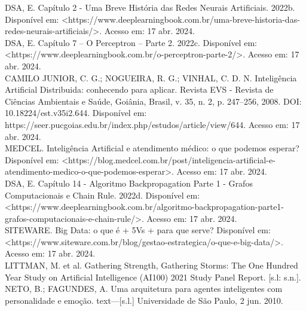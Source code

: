 \documentclass[a4paper,12pt]{article}
\begin{document}
\noindent DSA, E. Capítulo 2 - Uma Breve História das Redes Neurais Artificiais. 2022b. Disponível em: <https://www.deeplearningbook.com.br/uma-breve-historia-das-redes-neurais-artificiais/>. Acesso em: 17 abr. 2024. \\

\noindent DSA, E. Capítulo 7 – O Perceptron – Parte 2. 2022c. Disponível em: <https://www.deeplearningbook.com.br/o-perceptron-parte-2/>. Acesso em: 17 abr. 2024. \\

\noindent CAMILO JUNIOR, C. G.; NOGUEIRA, R. G.; VINHAL, C. D. N. Inteligência Artificial Distribuida: conhecendo para aplicar. Revista EVS - Revista de Ciências Ambientais e Saúde, Goiânia, Brasil, v. 35, n. 2, p. 247–256, 2008. DOI: 10.18224/est.v35i2.644. Disponível em: https://seer.pucgoias.edu.br/index.php/estudos/article/view/644. Acesso em: 17 abr. 2024. \\

\noindent MEDCEL. Inteligência Artificial e atendimento médico: o que podemos esperar? Disponível em: <https://blog.medcel.com.br/post/inteligencia-artificial-e-atendimento-medico-o-que-podemos-esperar>. Acesso em: 17 abr. 2024. \\

\noindent DSA, E. Capítulo 14 - Algoritmo Backpropagation Parte 1 - Grafos Computacionais e Chain Rule. 2022d. Disponível em: <https://www.deeplearningbook.com.br/algoritmo-backpropagation-parte1-grafos-computacionais-e-chain-rule/>. Acesso em: 17 abr. 2024. \\

\noindent SITEWARE. Big Data: o que é + 5Vs + para que serve? Disponível em: <https://www.siteware.com.br/blog/gestao-estrategica/o-que-e-big-data/>. Acesso em: 17 abr. 2024. \\

\noindent LITTMAN, M. et al. Gathering Strength, Gathering Storms: The One Hundred Year Study on Artificial Intelligence (AI100) 2021 Study Panel Report. [s.l: s.n.]. \\

\noindent NETO, B.; FAGUNDES, A. Uma arquitetura para agentes inteligentes com personalidade e emoção. text—[s.l.] Universidade de São Paulo, 2 jun. 2010. \\
\end{document}
